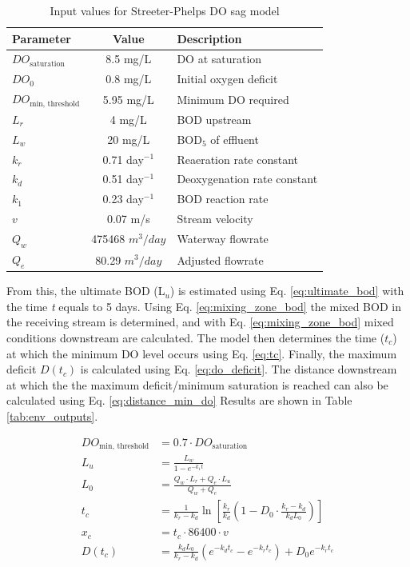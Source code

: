 \documentclass[12pt]{article}
\begin{document}
\begin{table}[h]
  \centering
  \caption{Input values for Streeter-Phelps DO sag model}
  \label{tab:env_inputs}
  \begin{tabular}{|l|c|l|}
  \hline
  \textbf{Parameter} & \textbf{Value} & \textbf{Description} \\
  \hline
  $DO_{\text{saturation}}$ & 8.5 mg/L & DO at saturation \\
  $DO_0$ & 0.8 mg/L & Initial oxygen deficit \\
  $DO_{\text{min, threshold}}$ & 5.95 mg/L & Minimum DO required \\
  $L_r$ & 4 mg/L & BOD upstream \\
  $L_w$ & 20 mg/L & BOD$_5$ of effluent \\
  $k_r$ & 0.71 day$^{-1}$ & Reaeration rate constant \\
  $k_d$ & 0.51 day$^{-1}$ & Deoxygenation rate constant \\
  $k_1$ & 0.23 day$^{-1}$ & BOD reaction rate \\
  $v$ & 0.07 m/s & Stream velocity \\
  $Q_w$ & 475468 $m^3/day$ & Waterway flowrate\\
  $Q_e$ &
80.29
  $m^3/day$ & Adjusted flowrate\\
  \hline
  \end{tabular}
\end{table}


From this, the ultimate BOD (L$_u$) is estimated using Eq. \eqref{eq:ultimate_bod} with the time \textit{t} 
equals to 5 days. Using Eq. \eqref{eq:mixing_zone_bod} the mixed BOD in the receiving stream is
determined, and with Eq. \eqref{eq:mixing_zone_bod} mixed conditions downstream are calculated.
The model then determines the time ($t_c$) at which the minimum DO level occurs using Eq. \eqref{eq:tc}. 
Finally, the maximum deficit $D(t_c)$ is calculated using Eq. \eqref{eq:do_deficit}.
The distance downstream at which the the maximum deficit/minimum saturation 
is reached can also be calculated using Eq. \eqref{eq:distance_min_do} Results are 
shown in Table \ref{tab:env_outputs}.

\begin{align}
DO_{\text{min, threshold}} &= 0.7 \cdot DO_{\text{saturation}} \label{eq:do_threshold} \\
L_u &= \frac{L_w}{1 - e^{-k_1 t}} \label{eq:ultimate_bod} \\
L_0 &= \frac{Q_w \cdot L_r + Q_e \cdot L_u}{Q_w + Q_e} \label{eq:mixing_zone_bod} \\
t_c &= \frac{1}{k_r - k_d} \ln \left[ \frac{k_r}{k_d} \left(1 - D_0 \cdot \frac{k_r - k_d}{k_d L_0} \right) \right] \label{eq:tc} \\
x_c &= t_c \cdot 86400 \cdot v \label{eq:distance_min_do} \\
D(t_c) &= \frac{k_d L_0}{k_r - k_d} \left(e^{-k_d t_c} - e^{-k_r t_c}\right) + D_0 e^{-k_r t_c} \label{eq:do_deficit}
\end{align}
\end{document}
